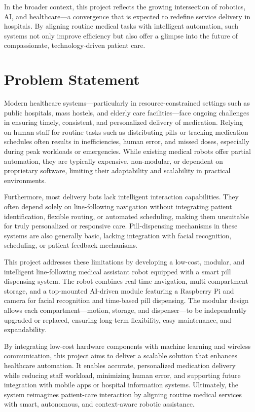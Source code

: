 In the broader context, this project reflects the growing intersection of robotics, AI, and healthcare—a convergence that is expected to redefine service delivery in hospitals. By aligning routine medical tasks with intelligent automation, such systems not only improve efficiency but also offer a glimpse into the future of compassionate, technology-driven patient care.

\vspace{1.5\baselineskip} 

\section{Problem Statement}
Modern healthcare systems—particularly in resource-constrained settings such as public hospitals, mass hostels, and elderly care facilities—face ongoing challenges in ensuring timely, consistent, and personalized delivery of medication. Relying on human staff for routine tasks such as distributing pills or tracking medication schedules often results in inefficiencies, human error, and missed doses, especially during peak workloads or emergencies. While existing medical robots offer partial automation, they are typically expensive, non-modular, or dependent on proprietary software, limiting their adaptability and scalability in practical environments.

Furthermore, most delivery bots lack intelligent interaction capabilities. They often depend solely on line-following navigation without integrating patient identification, flexible routing, or automated scheduling, making them unsuitable for truly personalized or responsive care. Pill-dispensing mechanisms in these systems are also generally basic, lacking integration with facial recognition, scheduling, or patient feedback mechanisms.

This project addresses these limitations by developing a low-cost, modular, and intelligent line-following medical assistant robot equipped with a smart pill dispensing system. The robot combines real-time navigation, multi-compartment storage, and a top-mounted AI-driven module featuring a Raspberry Pi and camera for facial recognition and time-based pill dispensing. The modular design allows each compartment—motion, storage, and dispenser—to be independently upgraded or replaced, ensuring long-term flexibility, easy maintenance, and expandability.

By integrating low-cost hardware components with machine learning and wireless communication, this project aims to deliver a scalable solution that enhances healthcare automation. It enables accurate, personalized medication delivery while reducing staff workload, minimizing human error, and supporting future integration with mobile apps or hospital information systems. Ultimately, the system reimagines patient-care interaction by aligning routine medical services with smart, autonomous, and context-aware robotic assistance. 

